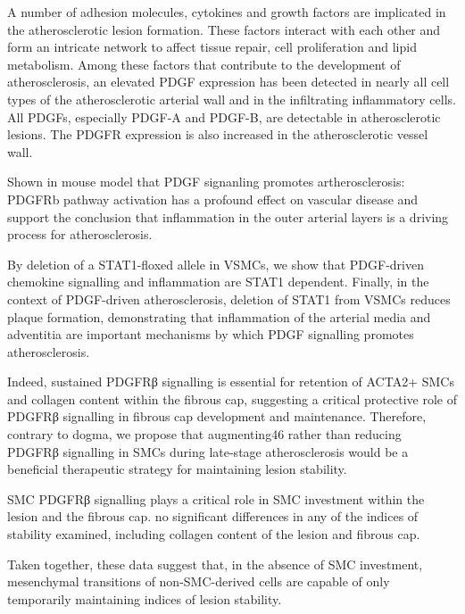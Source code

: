     A number of adhesion molecules, cytokines and growth factors are implicated in the atherosclerotic lesion formation. These factors interact with each other and form an intricate network to affect tissue repair, cell proliferation and lipid metabolism. Among these factors that contribute to the development of atherosclerosis, an elevated PDGF expression has been detected in nearly all cell types of the atherosclerotic arterial wall and in the infiltrating inflammatory cells. All PDGFs, especially PDGF-A and PDGF-B, are detectable in atherosclerotic lesions. The PDGFR expression is also increased in the atherosclerotic vessel wall.
    \cite{huTargetingPlateletderivedGrowth2015}

    Shown in mouse model that PDGF signanling promotes artherosclerosis: PDGFRb pathway activation has a profound effect on vascular disease and support the conclusion that inflammation in the outer arterial layers is a driving process for atherosclerosis.

    By deletion of a STAT1-floxed allele in VSMCs, we show that PDGF-driven chemokine signalling and inflammation are STAT1 dependent. Finally, in the context of PDGF-driven atherosclerosis, deletion of STAT1 from VSMCs reduces plaque formation, demonstrating that inflammation of the arterial media and adventitia are important mechanisms by which PDGF signalling promotes atherosclerosis.
    \cite{hePDGFRvSignallingRegulates2015}


    Indeed, sustained PDGFRβ signalling is essential for retention of ACTA2+ SMCs and collagen content within the fibrous cap, suggesting a critical protective role of PDGFRβ signalling in fibrous cap development and maintenance. Therefore, contrary to dogma, we propose that augmenting46 rather than reducing PDGFRβ signalling in SMCs during late-stage atherosclerosis would be a beneficial therapeutic strategy for maintaining lesion stability.

    SMC PDGFRβ signalling plays a critical role in SMC investment within the lesion and the fibrous cap. no significant differences in any of the indices of stability examined, including collagen content of the lesion and fibrous cap.

    Taken together, these data suggest that, in the absence of SMC investment, mesenchymal transitions of non-SMC-derived cells are capable of only temporarily maintaining indices of lesion stability.
    \cite{newmanMultipleCellTypes2021}
